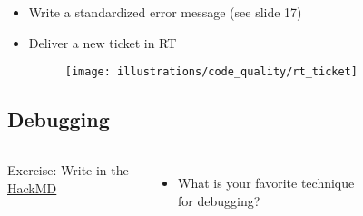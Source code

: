 \documentclass[usenames,dvipsnames]{beamer}
\theoremstyle{plain}
\theoremstyle{definition}
\begin{document}
\begin{frame}{\setframetitle{}}
  {
    \begin{itemize}
    \item Write a standardized error message (see slide 17)

    \item Deliver a new ticket in RT

      \begin{figure}
        \captionsetup[subfigure]{justification=centering}
        \centering
        {\texttt{[image: illustrations/code\_quality/rt\_ticket]}}
      \end{figure}

    \end{itemize}
  }
\end{frame}




\subsection{Debugging}


\begin{frame}{\setframetitle{}}
  {
    \begin{columns}%

       Exercise:
      Write in the \href{https://hackmd.io/dYZPs_f9Q6mW423kzkgwsQ}{\color{gray} HackMD}
      \begin{itemize}
      \item What is your favorite technique for debugging?
        \end{itemize}



     \begin{figure}
       \centering
         {}
       \end{figure}

\end{columns}

  }
\end{frame}
\end{document}
